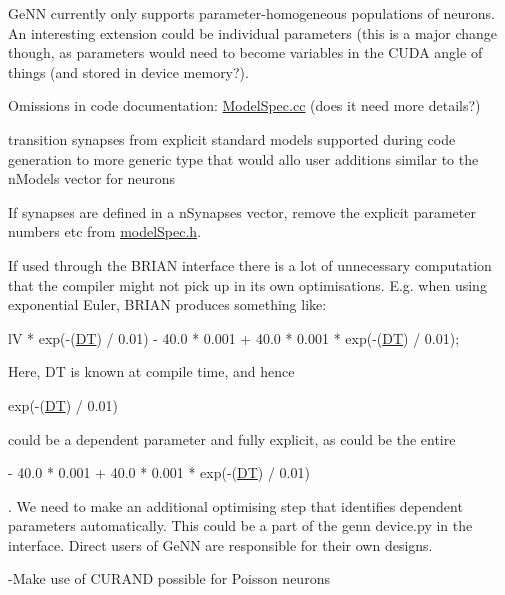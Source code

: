 \begin{DoxyItemize}
\begin{DoxyItemize}
\end{DoxyItemize}
\item Ge\+N\+N currently only supports parameter-\/homogeneous populations of neurons. An interesting extension could be individual parameters (this is a major change though, as parameters would need to become variables in the C\+U\+D\+A angle of things (and stored in device memory?).
\item Omissions in code documentation\+: \hyperlink{modelSpec_8cc}{Model\+Spec.\+cc} (does it need more details?)
\item transition synapses from explicit standard models supported during code generation to more generic type that would allo user additions similar to the n\+Models vector for neurons
\item If synapses are defined in a n\+Synapses vector, remove the explicit parameter numbers etc from \hyperlink{modelSpec_8h}{model\+Spec.\+h}.
\item If used through the B\+R\+I\+A\+N interface there is a lot of unnecessary computation that the compiler might not pick up in its own optimisations. E.\+g. when using exponential Euler, B\+R\+I\+A\+N produces something like\+: 
\begin{DoxyCode}
lV * exp(-(\hyperlink{tmp_2model_2MBody__userdef_8cc_a943f07034774ef1261d62cd0d3d1fec9}{DT}) / 0.01) - 40.0 * 0.001 + 40.0 * 0.001 * exp(-(\hyperlink{tmp_2model_2MBody__userdef_8cc_a943f07034774ef1261d62cd0d3d1fec9}{DT}) / 0.01);
\end{DoxyCode}
 Here, D\+T is known at compile time, and hence
\begin{DoxyCode}
exp(-(\hyperlink{tmp_2model_2MBody__userdef_8cc_a943f07034774ef1261d62cd0d3d1fec9}{DT}) / 0.01) 
\end{DoxyCode}
 could be a dependent parameter and fully explicit, as could be the entire
\begin{DoxyCode}
- 40.0 * 0.001 + 40.0 * 0.001 * exp(-(\hyperlink{tmp_2model_2MBody__userdef_8cc_a943f07034774ef1261d62cd0d3d1fec9}{DT}) / 0.01)
\end{DoxyCode}
. We need to make an additional optimising step that identifies dependent parameters automatically. This could be a part of the genn device.\+py in the interface. Direct users of Ge\+N\+N are responsible for their own designs.
\end{DoxyItemize}

-\/\+Make use of C\+U\+R\+A\+N\+D possible for Poisson neurons 